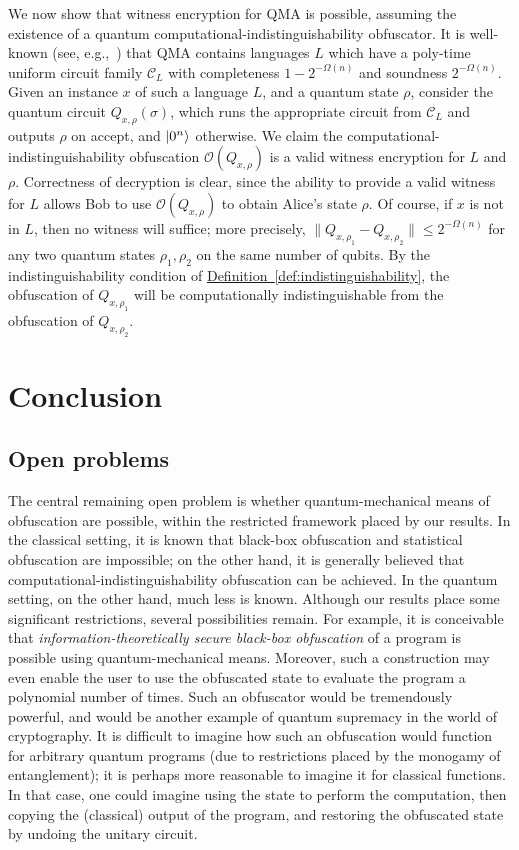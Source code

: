 \documentclass[11pt]{article}
\numberwithin{equation}{section}
\newcommand{\expref}[2]{\texorpdfstring{\hyperref[#2]{#1~\ref{#2}}}{#1~\ref{#2}}}
\newcommand{\algo}{\mathcal}
\begin{document}
{We now show that witness encryption for QMA is possible, assuming the existence of a quantum computational-indistinguishability obfuscator. It is well-known (see, e.g.,~\cite{GN13}) that QMA contains languages $L$ which have a poly-time uniform circuit family $\mathcal C_L$ with completeness $1-2^{-\Omega(n)}$ and soundness $2^{-\Omega(n)}$. Given an instance $x$ of such a language $L$, and a quantum state $\rho$, consider the quantum circuit $Q_{x,\rho}(\sigma)$, which runs the appropriate circuit from $\mathcal C_L$ and outputs $\rho$ on accept, and ${\left\vert{0^n}\right\rangle}$ otherwise.  We claim the computational-indistinguishability obfuscation $\algo{O}(Q_{x,\rho})$ is a valid witness encryption for $L$ and $\rho$.  Correctness of decryption is clear, since the ability to provide a valid witness for $L$ allows Bob to use $\algo{O}(Q_{x,\rho})$ to obtain Alice's state $\rho$.  Of course, if $x$ is not in $L$, then no witness will suffice; more precisely, $\|Q_{x,\rho_1} - Q_{x, \rho_2}\| \leq 2^{-\Omega(n)}$ for any two quantum states $\rho_1, \rho_2$ on the same number of qubits. By the indistinguishability condition of \expref{Definition}{def:indistinguishability}, the obfuscation of $Q_{x,\rho_1}$ will be computationally indistinguishable from the obfuscation of $Q_{x,\rho_2}$.


\section{Conclusion}

\subsection{Open problems}

The central remaining open problem is whether quantum-mechanical means of obfuscation are possible, within the restricted framework placed by our results. In the classical setting, it is known that black-box obfuscation and statistical obfuscation are impossible; on the other hand, it is generally believed that computational-indistinguishability obfuscation can be achieved. In the quantum setting, on the other hand, much less is known. Although our results place some significant restrictions, several possibilities remain. For example, it is conceivable that \emph{information-theoretically secure black-box obfuscation} of a program is possible using quantum-mechanical means. Moreover, such a construction may even enable the user to use the obfuscated state to evaluate the program a polynomial number of times. Such an obfuscator would be tremendously powerful, and would be another example of quantum supremacy in the world of cryptography. It is difficult to imagine how such an obfuscation would function for arbitrary quantum programs (due to restrictions placed by the monogamy of entanglement); it is perhaps more reasonable to imagine it for classical functions. In that case, one could imagine using the state to perform the computation, then copying the (classical) output of the program, and restoring the obfuscated state by undoing the unitary circuit.

}
\end{document}
